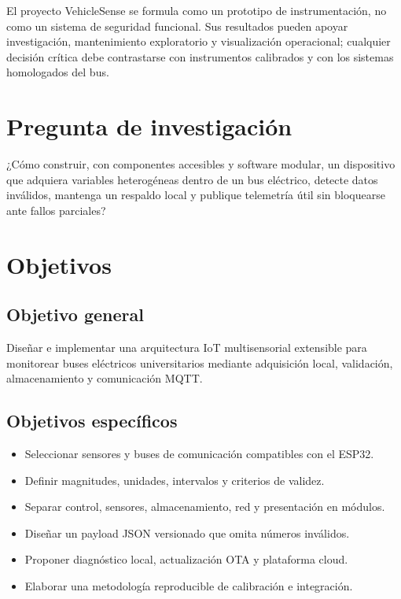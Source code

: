\documentclass[11pt,a4paper,oneside]{report}
\begin{document}
El proyecto VehicleSense se formula como un prototipo de instrumentación, no como un
sistema de seguridad funcional. Sus resultados pueden apoyar investigación,
mantenimiento exploratorio y visualización operacional; cualquier decisión crítica
debe contrastarse con instrumentos calibrados y con los sistemas homologados del bus.

\section{Pregunta de investigación}
\begin{vsidea}
¿Cómo construir, con componentes accesibles y software modular, un dispositivo que
adquiera variables heterogéneas dentro de un bus eléctrico, detecte datos inválidos,
mantenga un respaldo local y publique telemetría útil sin bloquearse ante fallos
parciales?
\end{vsidea}

\section{Objetivos}
\subsection{Objetivo general}
Diseñar e implementar una arquitectura IoT multisensorial extensible para monitorear
buses eléctricos universitarios mediante adquisición local, validación, almacenamiento
y comunicación MQTT.

\subsection{Objetivos específicos}
\begin{itemize}
  \item Seleccionar sensores y buses de comunicación compatibles con el ESP32.
  \item Definir magnitudes, unidades, intervalos y criterios de validez.
  \item Separar control, sensores, almacenamiento, red y presentación en módulos.
  \item Diseñar un payload JSON versionado que omita números inválidos.
  \item Proponer diagnóstico local, actualización OTA y plataforma cloud.
  \item Elaborar una metodología reproducible de calibración e integración.
\end{itemize}
\end{document}
